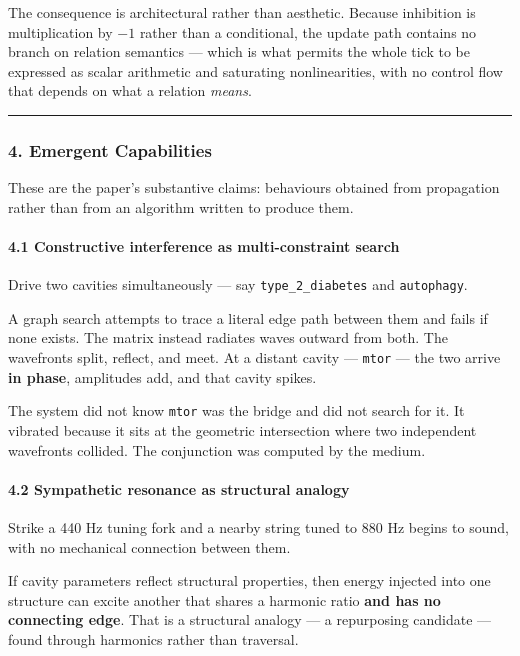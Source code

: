 \documentclass[
  11pt,
  a4paper,
]{article}
\begin{document}
The consequence is architectural rather than aesthetic. Because
inhibition is multiplication by \(-1\) rather than a conditional, the
update path contains no branch on relation semantics --- which is what
permits the whole tick to be expressed as scalar arithmetic and
saturating nonlinearities, with no control flow that depends on what a
relation \emph{means}.

\begin{center}\rule{0.5\linewidth}{0.5pt}\end{center}

\subsubsection{4. Emergent Capabilities}\label{emergent-capabilities}

These are the paper's substantive claims: behaviours obtained from
propagation rather than from an algorithm written to produce them.

\paragraph{4.1 Constructive interference as multi-constraint
search}\label{constructive-interference-as-multi-constraint-search}

Drive two cavities simultaneously --- say \texttt{type\_2\_diabetes} and
\texttt{autophagy}.

A graph search attempts to trace a literal edge path between them and
fails if none exists. The matrix instead radiates waves outward from
both. The wavefronts split, reflect, and meet. At a distant cavity ---
\texttt{mtor} --- the two arrive \textbf{in phase}, amplitudes add, and
that cavity spikes.

The system did not know \texttt{mtor} was the bridge and did not search
for it. It vibrated because it sits at the geometric intersection where
two independent wavefronts collided. The conjunction was computed by the
medium.

\paragraph{4.2 Sympathetic resonance as structural
analogy}\label{sympathetic-resonance-as-structural-analogy}

Strike a 440 Hz tuning fork and a nearby string tuned to 880 Hz begins
to sound, with no mechanical connection between them.

If cavity parameters reflect structural properties, then energy injected
into one structure can excite another that shares a harmonic ratio
\textbf{and has no connecting edge}. That is a structural analogy --- a
repurposing candidate --- found through harmonics rather than traversal.
\end{document}
